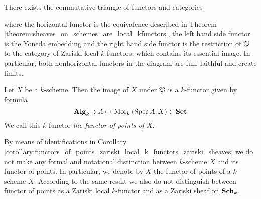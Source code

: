 \begin{corollary}\label{corollary:functors_of_points_zariski_local_k_functors_zariski_sheaves}
There exists the commutative triangle of functors and categories
\begin{center}
\end{center}
where the horizontal functor is the equivalence described in Theorem \ref{theorem:sheaves_on_schemes_are_local_kfunctors}, the left hand side functor is the Yoneda embedding and the right hand side functor is the restriction of ${\mathfrak P}$ to the category of Zariski local $k$-functors, which contains its essential image. In particular, both nonhorizontal functors in the diagram are full, faithful and create limits.
\end{corollary}

\begin{definition}
Let $X$ be a $k$-scheme. Then the image of $X$ under ${\mathfrak P}$ is a $k$-functor given by formula
$$\mathbf{Alg}_k\ni A \mapsto \mathrm{Mor}_k\left(\mathrm{Spec}\, A,X\right) \in \mathbf{Set}$$
We call this $k$-functor \textit{the functor of points of $X$}.
\end{definition}

\begin{remark}\label{remark:functors_of_points}
By means of identifications in Corollary \ref{corollary:functors_of_points_zariski_local_k_functors_zariski_sheaves} we do not make any formal and notational distinction between $k$-scheme $X$ and its functor of points. In particular, we denote by $X$ the functor of points of a $k$-scheme $X$. According to the same result we also do not distinguish between functor of points as a Zariski local $k$-functor and as a Zariski sheaf on $\mathbf{Sch}_k$.
\end{remark}

